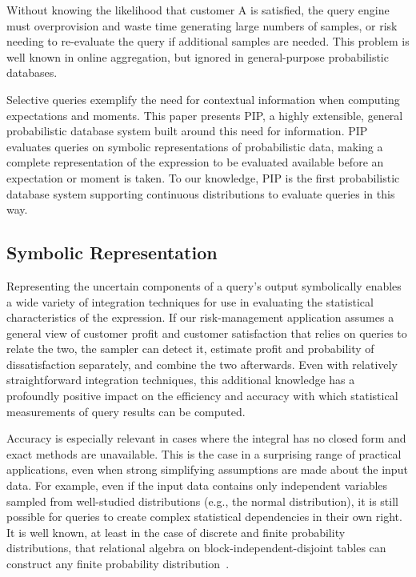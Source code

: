 Without knowing the likelihood that customer A is satisfied, the query engine must overprovision and waste time generating large numbers of samples, or risk needing to re-evaluate the query if additional samples are needed.  This problem is well known in online aggregation, but ignored in general-purpose probabilistic databases.  

Selective queries exemplify the need for contextual information when computing expectations and moments.  This paper presents PIP, a highly extensible, general probabilistic database system built around this need for information.  PIP evaluates queries on symbolic representations of probabilistic data, making a complete representation of the expression to be evaluated available before an expectation or moment is taken.  To our knowledge, PIP is the first probabilistic database system supporting continuous distributions to evaluate queries in this way.

\subsection{Symbolic Representation}
Representing the uncertain components of a query's output symbolically enables a wide variety of integration techniques for use in evaluating the statistical characteristics of the expression.  If our risk-management application assumes a general view of customer profit and customer satisfaction that relies on queries to relate the two, the sampler can detect it, estimate profit and probability of dissatisfaction separately, and combine the two afterwards.  Even with relatively straightforward integration techniques, this additional knowledge has a profoundly positive impact on the efficiency and accuracy with which statistical measurements of query results can be computed.

Accuracy is especially relevant in cases where the integral has no closed form and exact methods are unavailable.  This is the case in a surprising range of practical applications, even when strong simplifying assumptions are made about the input data.  For example, even if the input data contains only independent variables sampled from well-studied distributions (e.g., the normal distribution), it is still possible for queries to create complex statistical dependencies in their own right.  It is well known, at least in the case of discrete and finite probability distributions, that relational algebra on block-independent-disjoint tables can construct any finite probability distribution\ \cite{1325861,IL1984}.

